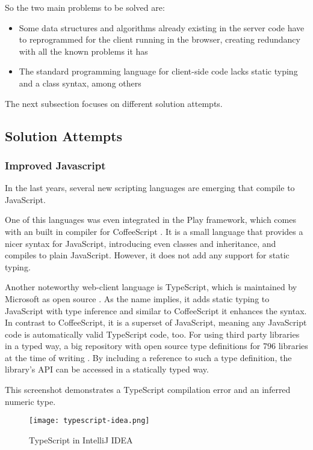 So the two main problems to be solved are:

\begin{itemize}
\item Some data structures and algorithms already existing in the server code have to reprogrammed for the client running in the browser, creating redundancy with all the known problems it has
\item The standard programming language for client-side code lacks static typing and a class syntax, among others
\end{itemize}

The next subsection focuses on different solution attempts.

\subsection{Solution Attempts}

\subsubsection{Improved Javascript}

In the last years, several new scripting languages are emerging that compile to JavaScript. 

One of this languages was even integrated in the Play framework, which comes with an built in compiler for CoffeeScript \cite{coffeescript}. It is a small language that provides a nicer syntax for JavaScript, introducing even classes and inheritance, and compiles to plain JavaScript. However, it does not add any support for static typing.

Another noteworthy web-client language is TypeScript, which is maintained by Microsoft as open source \cite{typescript}. As the name implies, it adds static typing to JavaScript with type inference and similar to CoffeeScript it enhances the syntax. In contrast to CoffeeScript, it is a superset of JavaScript, meaning any JavaScript code is automatically valid TypeScript code, too. 
For using third party libraries in a typed way, a big repository with open source type definitions for 796 libraries at the time of writing \cite{typescript-repo}. By including a reference to such a type definition, the library's API can be accessed in a statically typed way.

This screenshot demonstrates a TypeScript compilation error and an inferred numeric type.
\begin{figure}[H]
\centering
\texttt{[image: typescript-idea.png]}
\caption{TypeScript in IntelliJ IDEA}
\end{figure}

